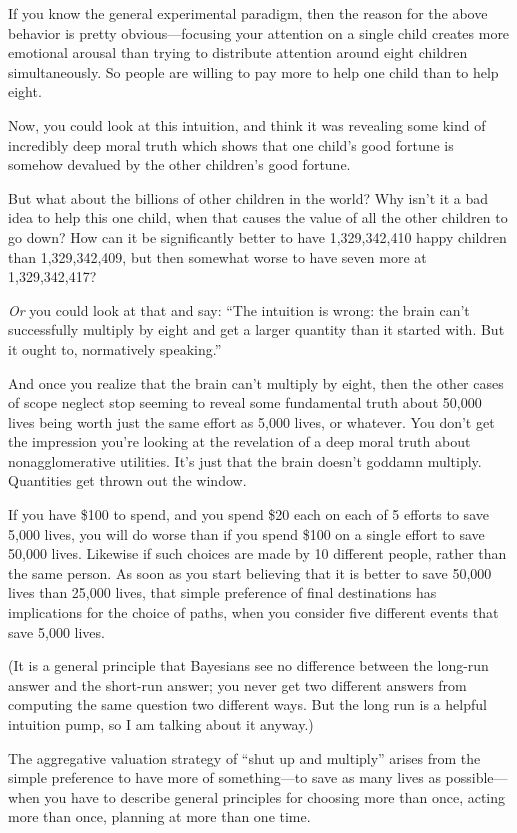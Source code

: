  If you know the general experimental paradigm, then the reason for
the above behavior is pretty obvious---focusing your attention on a
single child creates more emotional arousal than trying to distribute
attention around eight children simultaneously. So people are willing
to pay more to help one child than to help eight.


 Now, you could look at this intuition, and think it was revealing
some kind of incredibly deep moral truth which shows that one
child's good fortune is somehow devalued by the other
children's good fortune.


 But what about the billions of other children in the world? Why
isn't it a bad idea to help this one child, when that
causes the value of all the other children to go down? How can it be
significantly better to have 1,329,342,410 happy children than
1,329,342,409, but then somewhat worse to have seven more at
1,329,342,417?


 \textit{Or} you could look at that and say: ``The
intuition is wrong: the brain can't successfully
multiply by eight and get a larger quantity than it started with. But
it ought to, normatively speaking.''


 And once you realize that the brain can't multiply
by eight, then the other cases of scope neglect stop seeming to reveal
some fundamental truth about 50,000 lives being worth just the same
effort as 5,000 lives, or whatever. You don't get the
impression you're looking at the revelation of a deep
moral truth about nonagglomerative utilities. It's just
that the brain doesn't goddamn multiply. Quantities get
thrown out the window.


 If you have \$100 to spend, and you spend \$20 each on each of 5
efforts to save 5,000 lives, you will do worse than if you spend \$100
on a single effort to save 50,000 lives. Likewise if such choices are
made by 10 different people, rather than the same person. As soon as
you start believing that it is better to save 50,000 lives than 25,000
lives, that simple preference of final destinations has implications
for the choice of paths, when you consider five different events that
save 5,000 lives.


 (It is a general principle that Bayesians see no difference
between the long-run answer and the short-run answer; you never get two
different answers from computing the same question two different ways.
But the long run is a helpful intuition pump, so I am talking about it
anyway.)


 The aggregative valuation strategy of ``shut up
and multiply'' arises from the simple preference to
have more of something---to save as many lives as possible---when you
have to describe general principles for choosing more than once, acting
more than once, planning at more than one time.


